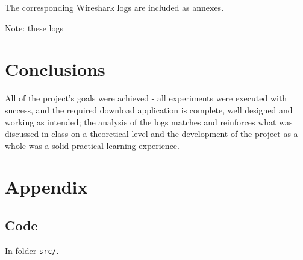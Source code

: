 \documentclass[11pt,a4paper,twocolumn]{article}
\begin{document}
The corresponding Wireshark logs are included as annexes.

Note: these logs 
\section{Conclusions}

All of the project's goals were achieved - all experiments were executed with success, and the required download application is complete, well designed and working as intended; the analysis of the logs matches and reinforces what was discussed in class on a theoretical level and the development of the project as a whole was a solid practical learning experience.

\onecolumn
\appendix
\section{Appendix}

\subsection{Code}

\noindent In folder \lstinline{src/}.
\end{document}
